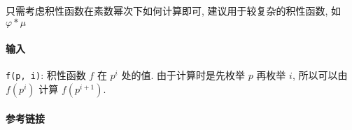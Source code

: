 只需考虑积性函数在素数幂次下如何计算即可, 建议用于较复杂的积性函数, 如 \(\varphi*\mu\)

\paragraph{输入}

\verb|f(p, i)|: 积性函数 \(f\) 在 \(p^i\) 处的值. 由于计算时是先枚举 \(p\) 再枚举 \(i\), 所以可以由 \(f(p^i)\) 计算 \(f(p^{i+1})\).

\paragraph{参考链接}

